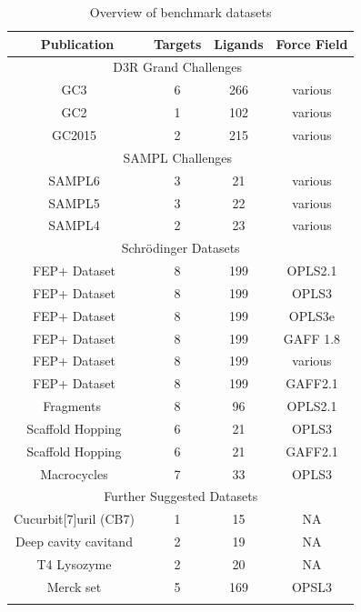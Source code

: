 \documentclass[9pt,bestpractices]{livecoms}
\begin{document}
\begin{table}
\caption{Overview of benchmark datasets}
\begin{tabular}{cccc}
\textbf{Publication} & \textbf{Targets} & \textbf{Ligands} & \textbf{Force Field} \\
\hline
\multicolumn{4}{|c|}{D3R Grand Challenges~\cite{D3R}} \\
\hline
GC3~\cite{gaieb2019d3r} & 6 & 266 & various \\
GC2~\cite{gaieb2018d3r} & 1 & 102 & various \\
GC2015~\cite{gathiaka2016d3r} & 2 & 215 & various \\
\hline
\multicolumn{4}{|c|}{SAMPL Challenges~\cite{SAMPL}} \\
\hline
SAMPL6~\cite{rizzi2018overview} & 3 & 21 & various \\
SAMPL5~\cite{yin2017overview} & 3 & 22 & various \\
SAMPL4~\cite{muddana2014sampl4} & 2 & 23 & various \\
\hline
\multicolumn{4}{|c|}{Schrödinger Datasets} \\
\hline
FEP+ Dataset~\cite{wang2015accurate} & 8 & 199 & OPLS2.1 \\
FEP+ Dataset~\cite{harder2016opls3} & 8 & 199 & OPLS3 \\
FEP+ Dataset~\cite{roos2019opls3e} & 8 & 199 & OPLS3e \\
FEP+ Dataset~\cite{song2019using} & 8 & 199 & GAFF 1.8 \\
FEP+ Dataset~\cite{gapsys2020large} & 8 & 199 & various \\
FEP+ Dataset~\cite{kuhn2020automated} & 8 & 199 & GAFF2.1 \\
Fragments ~\cite{steinbrecher2015accurate} & 8 & 96 & OPLS2.1 \\
Scaffold Hopping~\cite{wang2017accurate} & 6 & 21 & OPLS3 \\
Scaffold Hopping~\cite{kuhn2020automated} & 6 & 21 & GAFF2.1 \\
Macrocycles~\cite{yu2017accurate} & 7 & 33 & OPLS3 \\
\hline
\multicolumn{4}{|c|}{Further Suggested Datasets} \\
\hline
Cucurbit[7]uril (CB7)~\cite{mobley2017predicting} & 1 & 15 & NA \\
Deep cavity cavitand~\cite{mobley2017predicting} & 2 & 19 & NA \\
T4 Lysozyme~\cite{mobley2017predicting} & 2 & 20 & NA \\
Merck  set~\cite{MCompChem2019Sep} & 5 & 169 & OPSL3 \\

\hline
\label{tab:benchmarks}
\end{tabular}
\end{table}
\end{document}
